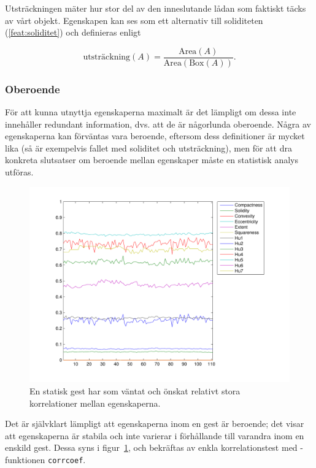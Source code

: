 \documentclass[../rapport_MVEX01-11-05]{subfiles}
\begin{document}
Utsträckningen mäter hur stor del av den inneslutande lådan som
faktiskt täcks av vårt objekt. Egenskapen kan ses som ett alternativ
till soliditeten (\ref{feat:soliditet}) och definieras enligt

\begin{equation*}
  \textrm{utsträckning}(A) =
  \frac{\textrm{Area}(A)}{\textrm{Area}(\textrm{Box}(A))}.
\end{equation*}

\subsubsection{Oberoende}

För att kunna utnyttja egenskaperna maximalt är det lämpligt om dessa
inte innehåller redundant information, dvs. att de är någorlunda
oberoende. Några av egenskaperna kan förväntas vara beroende, eftersom
dess definitioner är mycket lika (så är exempelvis fallet med
soliditet och utsträckning), men för att dra konkreta slutsatser om
beroende mellan egenskaper måste en statistisk analys utföras.

\begin{figure}[htbp]
	\centering
	\includegraphics[width=\textwidth]{bilder/feat-move}
	\caption{En statisk gest har som väntat och önskat relativt
	stora korrelationer mellan egenskaperna.}
	\label{fig:featmove}
\end{figure}

Det är självklart lämpligt att egenskaperna inom en gest är beroende;
det visar att egenskaperna är stabila och inte varierar i förhållande
till varandra inom en enskild gest. Dessa syns i
figur~\ref{fig:featmove}, och bekräftas av enkla korrelationstest med
\MATLAB-funktionen \texttt{corrcoef}.
\end{document}
